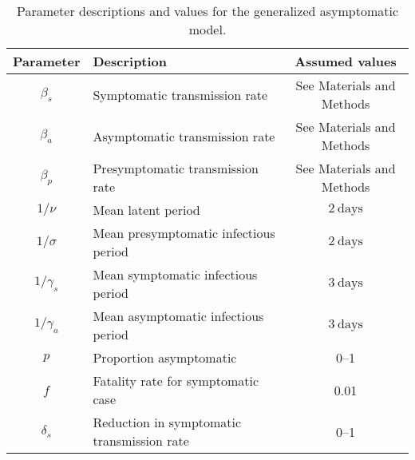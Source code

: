 \documentclass[12pt]{article}
\begin{document}
\begin{table}[h!]
  \begin{center}
    \begin{tabular}{c|l|c} %
      \textbf{Parameter} & \textbf{Description} & \textbf{Assumed values}\\
      \hline
      $\beta_s$ & Symptomatic transmission rate & See Materials and Methods\\
      \hline
      $\beta_a$ & Asymptomatic transmission rate & See Materials and Methods \\
      \hline
      $\beta_p$ & Presymptomatic transmission rate & See Materials and Methods \\
      \hline
      $1/\nu$ & Mean latent period & $2\ \mathrm{days}$\\
      \hline
      $1/\sigma$ & Mean presymptomatic infectious period & $2\ \mathrm{days}$\\
      \hline
      $1/\gamma_s$ & Mean symptomatic infectious period & $3\ \mathrm{days}$\\
      \hline
      $1/\gamma_a$ & Mean asymptomatic infectious period & $3\ \mathrm{days}$\\
      \hline
      $p$ & Proportion asymptomatic & 0--1\\
      \hline
      $f$ & Fatality rate for symptomatic case & 0.01\\
      \hline
      $\delta_s$ & Reduction in symptomatic transmission rate & 0--1\\
    \end{tabular}
    \caption{Parameter descriptions and values for the generalized asymptomatic model.}
    \label{tab:table2}
  \end{center}
\end{table}

\pagebreak
\end{document}
